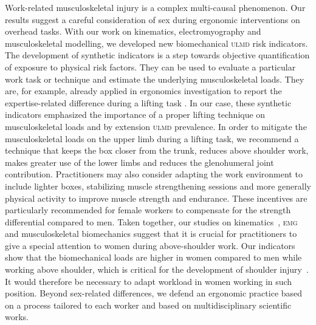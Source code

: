 Work-related musculoskeletal injury is a complex multi-causal phenomenon.
Our results suggest a careful consideration of sex during ergonomic interventions on overhead tasks.
With our work on kinematics, electromyography and musculoskeletal modelling, we developed new biomechanical \textsc{ulmd} risk indicators.
The development of synthetic indicators is a step towards objective quantification of exposure to physical risk factors.
They can be used to evaluate a particular work task or technique and estimate the underlying musculoskeletal loads.
They are, for example, already applied in ergonomics investigation to report the expertise-related difference during a lifting task \cite{goubault-evsn}.
In our case, these synthetic indicators emphasized the importance of a proper lifting technique on musculoskeletal loads and by extension \textsc{ulmd} prevalence.
In order to mitigate the musculoskeletal loads on the upper limb during a lifting task, we recommend a technique that keeps the box closer from the trunk, reduces above shoulder work, makes greater use of the lower limbs and reduces the glenohumeral joint contribution.
Practitioners may also consider adapting the work environment to include lighter boxes, stabilizing muscle strengthening sessions and more generally physical activity to improve muscle strength and endurance.
These incentives are particularly recommended for female workers to compensate for the strength differential compared to men.
Taken together, our studies on kinematics~\citep{Martinez2019-mm}, \textsc{emg}~\citep{Bouffard2019-fd} and musculoskeletal biomechanics suggest that it is crucial for practitioners to give a special attention to women during above-shoulder work.
Our indicators show that the biomechanical loads are higher in women compared to men while working above shoulder, which is critical for the development of shoulder injury~\citep{Van_der_Molen2017-sb}.
It would therefore be necessary to adapt workload in women working in such position.
Beyond sex-related differences, we defend an ergonomic practice based on a process tailored to each worker and based on multidisciplinary scientific works.